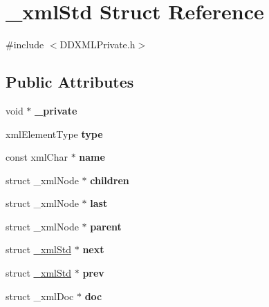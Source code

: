 \hypertarget{struct__xml_std}{}\section{\+\_\+xml\+Std Struct Reference}
\label{struct__xml_std}


{\ttfamily \#include $<$D\+D\+X\+M\+L\+Private.\+h$>$}

\subsection*{Public Attributes}
\begin{DoxyCompactItemize}
\item 
\hypertarget{struct__xml_std_a1fe650c5dbb1de3491081adc4f9c6ab1}{}void $\ast$ {\bfseries \+\_\+private}\label{struct__xml_std_a1fe650c5dbb1de3491081adc4f9c6ab1}

\item 
\hypertarget{struct__xml_std_ab8f98319e6c00b26eb73f640bc8d96de}{}xml\+Element\+Type {\bfseries type}\label{struct__xml_std_ab8f98319e6c00b26eb73f640bc8d96de}

\item 
\hypertarget{struct__xml_std_a4d6b3f48fe09cfbddb72b9313a58b76e}{}const xml\+Char $\ast$ {\bfseries name}\label{struct__xml_std_a4d6b3f48fe09cfbddb72b9313a58b76e}

\item 
\hypertarget{struct__xml_std_a1d19a44c833d646120b6b7e85c94da3f}{}struct \+\_\+xml\+Node $\ast$ {\bfseries children}\label{struct__xml_std_a1d19a44c833d646120b6b7e85c94da3f}

\item 
\hypertarget{struct__xml_std_a5c9704d3a920e143590987b6e80fe2a2}{}struct \+\_\+xml\+Node $\ast$ {\bfseries last}\label{struct__xml_std_a5c9704d3a920e143590987b6e80fe2a2}

\item 
\hypertarget{struct__xml_std_aaae9938e0b3f23fcf7a94cc06d53ffa9}{}struct \+\_\+xml\+Node $\ast$ {\bfseries parent}\label{struct__xml_std_aaae9938e0b3f23fcf7a94cc06d53ffa9}

\item 
\hypertarget{struct__xml_std_ac185fdfbb14538bac7eca9fc4e225f49}{}struct \hyperlink{struct__xml_std}{\+\_\+xml\+Std} $\ast$ {\bfseries next}\label{struct__xml_std_ac185fdfbb14538bac7eca9fc4e225f49}

\item 
\hypertarget{struct__xml_std_af1657a4e167a930aab1278836587497a}{}struct \hyperlink{struct__xml_std}{\+\_\+xml\+Std} $\ast$ {\bfseries prev}\label{struct__xml_std_af1657a4e167a930aab1278836587497a}

\item 
\hypertarget{struct__xml_std_aee572ef20be937a399deca9db224d768}{}struct \+\_\+xml\+Doc $\ast$ {\bfseries doc}\label{struct__xml_std_aee572ef20be937a399deca9db224d768}

\end{DoxyCompactItemize}


